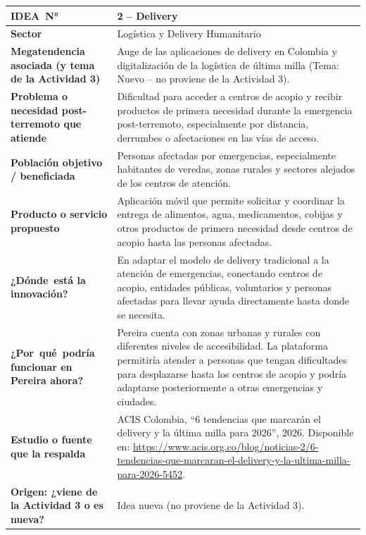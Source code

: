 \documentclass[11pt,a4paper]{article}
\newcommand{\fichaactividad}[9]{%
    \def\fIdea{#1}%
    \def\fSector{#2}%
    \def\fMega{#3}%
    \def\fProb{#4}%
    \def\fPobl{#5}%
    \def\fProd{#6}%
    \def\fInno{#7}%
    \def\fPere{#8}%
    \def\fFuen{#9}%
    \fichaactividadb%
}
\newcommand{\fichaactividadb}[1]{%
\begin{table}[H]
\centering
\sffamily
\renewcommand{\arraystretch}{1.52}
\setlength{\tabcolsep}{9pt}
\small
\begin{tabularx}{\textwidth}{|>{\centering\arraybackslash\bfseries\color{white}\columncolor{coloractualficha}\hsize=0.32\hsize}X|>{\arraybackslash\hsize=0.68\hsize}X|}
\hline
\mbox{IDEA N°} & \cellcolor{bgactualficha}\textbf{\color{coloractualficha}\fIdea} \\
\hline
Sector & \fSector \\
\hline
Megatendencia asociada (y tema de la Actividad 3) & \fMega \\
\hline
Problema o necesidad post-terremoto que atiende & \fProb \\
\hline
Población objetivo / beneficiada & \fPobl \\
\hline
Producto o servicio propuesto & \fProd \\
\hline
\mbox{¿Dónde está} la innovación? & \fInno \\
\hline
\mbox{¿Por qué podría} funcionar en Pereira ahora? & \fPere \\
\hline
Estudio o fuente que la respalda & \fFuen \\
\hline
Origen: ¿viene de la Actividad 3 o es nueva? & #1 \\
\hline
\end{tabularx}
\end{table}
}
\begin{document}
\fichaactividad
{2 -- Delivery}
{Logística y Delivery Humanitario}
{Auge de las aplicaciones de delivery en Colombia y digitalización de la logística de última milla (Tema: Nuevo -- no proviene de la Actividad 3).}
{Dificultad para acceder a centros de acopio y recibir productos de primera necesidad durante la emergencia post-terremoto, especialmente por distancia, derrumbes o afectaciones en las vías de acceso.}
{Personas afectadas por emergencias, especialmente habitantes de veredas, zonas rurales y sectores alejados de los centros de atención.}
{Aplicación móvil que permite solicitar y coordinar la entrega de alimentos, agua, medicamentos, cobijas y otros productos de primera necesidad desde centros de acopio hasta las personas afectadas.}
{En adaptar el modelo de delivery tradicional a la atención de emergencias, conectando centros de acopio, entidades públicas, voluntarios y personas afectadas para llevar ayuda directamente hasta donde se necesita.}
{Pereira cuenta con zonas urbanas y rurales con diferentes niveles de accesibilidad. La plataforma permitiría atender a personas que tengan dificultades para desplazarse hasta los centros de acopio y podría adaptarse posteriormente a otras emergencias y ciudades.}
{ACIS Colombia, ``6 tendencias que marcarán el delivery y la última milla para 2026'', 2026. Disponible en: \url{https://www.acis.org.co/blog/noticias-2/6-tendencias-que-marcaran-el-delivery-y-la-ultima-milla-para-2026-5452}.}
{Idea nueva (no proviene de la Actividad 3).}

\newpage
\end{document}
